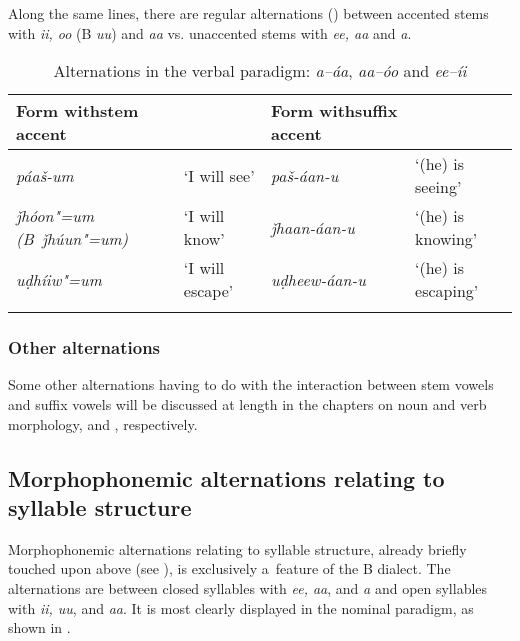 Along the same lines, there are regular alternations () between accented stems with \textit{ii, oo} (B \textit{uu}) and \textit{aa} vs. unaccented stems with \textit{ee, aa} and \textit{a}.



\begin{table}[ht]
\caption{Alternations in the verbal paradigm: \textit{a--áa}, \textit{aa--óo} and \textit{ee--íi}}
\begin{tabularx}{\textwidth}{ Q l Q l }
\lsptoprule
Form with\newline stem accent &
&
Form with\newline suffix accent &
\\\hline
\textit{páaš-um} &
`I will see' &
\textit{paš-áan-u} &
`(he) is seeing'\\
\textit{ǰhóon"=um (B~ǰhúun"=um)} &
`I will know' &
\textit{ǰhaan-áan-u} &
`(he) is knowing'\\
\textit{uḍhíiw"=um} &
`I will escape' &
\textit{uḍheew-áan-u} &
`(he) is escaping'\\\lspbottomrule
\end{tabularx}
\label{tab:3-14}
\end{table}

\subsubsection*{Other alternations}

Some other alternations having to do with the interaction between stem vowels and suffix vowels will
be discussed at length in the chapters on noun and verb morphology,  and
, respectively.

\subsection{Morphophonemic alternations relating to syllable structure}
\label{subsec:3-5-2}


Morphophonemic alternations relating to syllable structure, already briefly touched upon above (see ), is exclusively a~feature of the B dialect. The alternations are between closed syllables with \textit{ee, aa}, and \textit{a} and open syllables with \textit{ii, uu}, and \textit{aa}. It is most clearly displayed in the nominal paradigm, as shown in .



